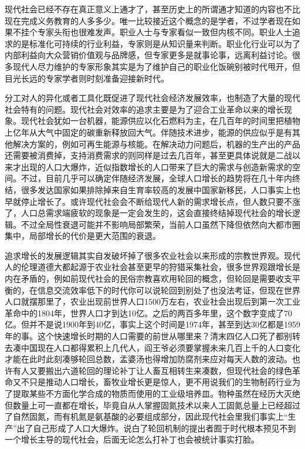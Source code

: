 \documentclass[]{tufte-book}
\begin{document}
现代社会已经不存在真正意义上通才了，甚至历史上的所谓通才知道的内容也不比现在完成义务教育的人多多少。唯一比较接近这个概念的是学者，不过学者现在如果不挂个专家头衔也很难发声。职业人士与专家看似一致但内核不同。职业人士追求的是标准化可持续的行业利益，专家则是从知识量来判断。职业化行业可以为了内部利益向大众营销价值观与品牌感，但专家更多是就事论事，远离利益讨论。很多现代人尽力维护的专家形象其实是为了维护自己的职业化饭碗别被时代甩开，但目光长远的专家学者则时刻准备迎接新时代。

分工对人的异化或者工具化既促进了现代社会经济发展效率，也制造了大量的现代社会特有的问题。现代社会对效率的追求主要是为了迎合工业革命以来的增长现象。现代社会犹如一台机器，能源供应以化石燃料为主，在几百年的时间里把植物上亿年从大气中固定的碳重新释放回大气。伴随技术进步，能源的供应似乎是有其他解决方案的，例如可再生能源与核能。在解决动力问题后，机器的生产出的产品还需要被消费掉，支持消费需求的则同样是过去几百年，甚至更具体说就是二战以来才出现的人口大爆炸，近似指数增长的人口带来了巨大的需求与创造新需求的空间。不过，目前几乎可以确定伴随经济发展，全球人口增长的趋势将在几十年内终结，很多发达国家如果排除掉来自生育率较高的发展中国家新移民，人口事实上也早就停止增长了。或许现代社会会不断给现代人新的需求增长点，但人数只要不涨了，人口总需求端疲软的现象是一定会发生的，这会直接终结掉现代社会的增长逻辑。不过全局性衰退可能并不影响局部繁荣，当前人口虽然下降但依然向大都市圈集中，局部增长的代价是更大范围的衰退。

追求增长的发展逻辑其实自发破坏掉了很多农业社会以来形成的宗教世界观。现代人的伦理道德大都起源于农业社会甚至更早的狩猎采集社会，很多世界观跟增长是内在矛盾的，例如前现代社会的民俗宗教喜欢用轮回的概念，但轮回是需要收支平衡的，在信息交流效率低下的时代你可以说轮回到别处了也没法考证，但现在世界人口就摆那里了，农业出现前世界人口1500万左右，农业社会出现后到第一次工业革命中的1804年，世界人口才到达10亿。之后的两百多年里，这个数字变成了70亿。但并不是说1900年到40亿，事实上这个时间是1974年，甚至到达30亿都是1959年的事。这个快速增长时期的人口需要的前世从哪里来？清末四亿人口死了都别转去凑中国现在人口都得累积上几代人，阎王爷必须要掌握未来几百上千的人口变化才能在此时此刻凑够轮回总数，孟婆汤也得增加防腐剂来应对每天人数的波动。也许有人又要搬出六道轮回的理论补丁让人畜互相转生来凑数，但现代社会的绿色革命又不只是推动人口增长，畜牧业增长更是惊人，更不用说我们的生物制药行业为了提取某些不方面化学合成的物质而使用的工业级培养皿。物种虽然在经历大灭绝但数量上可一直都在增长，毕竟自从人掌握固氮技术以来人工固氮总量上已经超过了自然固氮，而有机氮是氨基酸的必要组成部分，因此现代社会里我们事实上``生产''出了自己形成了人口大爆炸。说白了轮回机制的提出者囿于时代根本预见不到一个增长主导的现代社会，后面无论怎么打补丁也会被统计事实打脸。
\end{document}
